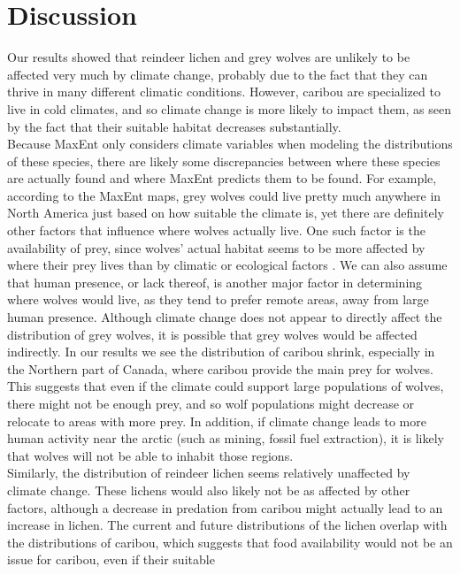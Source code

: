 \documentclass[twoside]{article}
\begin{document}
\section{Discussion}
\indent Our results showed that reindeer lichen and grey wolves are unlikely
to be affected very much by climate change, probably due to the fact
that they can thrive in many different climatic conditions. However,
caribou are specialized to live in cold climates, and so climate change
is more likely to impact them, as seen by the fact that their suitable
habitat decreases substantially. \\
\indent Because MaxEnt only considers climate variables when modeling the distributions
of these species, there are likely some discrepancies between where these
species are actually found and where MaxEnt predicts them to be found. For
example, according to the MaxEnt maps, grey wolves could live pretty much
anywhere in North America just based on how suitable the climate is, yet
there are definitely other factors that influence where wolves actually
live. One such factor is the availability of prey, since wolves’ actual
habitat seems to be more affected by where their prey lives than by climatic
or ecological factors \cite{usfs1}. We can also assume that human
presence, or lack thereof, is another major factor in determining where wolves
would live, as they tend to prefer remote areas, away from large human
presence. Although climate change does not appear to directly affect the
distribution of grey wolves, it is possible that grey wolves would be affected
indirectly. In our results we see the distribution of caribou shrink,
especially in the Northern part of Canada, where caribou provide the main
prey for wolves. This suggests that even if the climate could support
large populations of wolves, there might not be enough prey, and so wolf
populations might decrease or relocate to areas with more prey. In addition,
if climate change leads to more human activity near the arctic
(such as mining, fossil fuel extraction), it is likely that wolves will
not be able to inhabit those regions. \\
\indent Similarly, the distribution of reindeer lichen seems relatively unaffected
by climate change. These lichens would also likely not be as affected by
other factors, although a decrease in predation from caribou might actually
lead to an increase in lichen. The current and future distributions of the
lichen overlap with the distributions of caribou, which suggests that food
availability would not be an issue for caribou, even if their suitable
\end{document}
